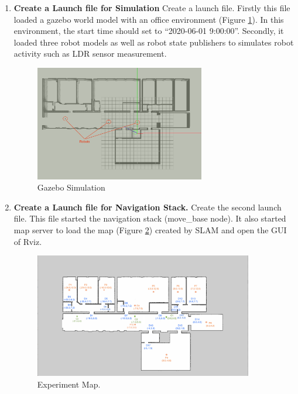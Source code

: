 \begin{enumerate}
\item \textbf{Create a Launch file for Simulation} Create a launch file. Firstly this file loaded a gazebo world model with an office environment (Figure \ref{fig:gazebo_model}). In this environment, the start time should set to ``2020-06-01 9:00:00''.  Secondly, it loaded three robot models as well as robot state publishers to simulates robot activity such as LDR sensor measurement.
\begin{figure}[htbp]
    \centering
    \includegraphics[width = 0.7\textwidth]{content/images/ch5/gazebo_model.png}
    \caption{Gazebo Simulation}
    \label{fig:gazebo_model}
\end{figure}
\item \textbf{Create a Launch file for Navigation Stack.} Create the second launch file. This file started the navigation stack (move\_base node). It also started map server to load the map (Figure \ref{fig:exp_map}) created by SLAM\cite{T3SLAM} and open the GUI of Rviz. 
\begin{figure}[htbp]
    \centering
    \includegraphics[width = 0.9\textwidth]{content/images/ch5/door_station_points.png}
    \caption{Experiment Map.}
    \label{fig:exp_map}
   \end{figure}


\end{enumerate}
